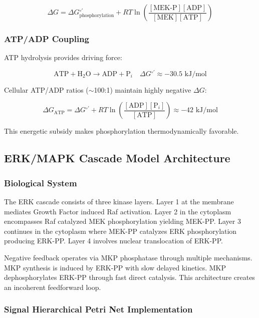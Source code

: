 \documentclass[twocolumn,11pt]{article}
\newcommand{\shpn}{Signal Hierarchical Petri Net}
\newcommand{\erk}{ERK}
\newcommand{\mkp}{MKP}
\newcommand{\mapk}{MAPK}
\newcommand{\dg}{\Delta G}
\begin{document}
\begin{equation}
\dg{} = \dg{}^{\circ\prime}_{\text{phosphorylation}} + RT \ln\left(\frac{[\text{MEK-P}][\text{ADP}]}{[\text{MEK}][\text{ATP}]}\right)
\end{equation}

\subsubsection{ATP/ADP Coupling}

ATP hydrolysis provides driving force:

\begin{equation}
\text{ATP} + \text{H}_2\text{O} \to \text{ADP} + \text{P}_i \quad \dg{}^{\circ\prime} \approx -30.5 \text{ kJ/mol}
\end{equation}

Cellular ATP/ADP ratios ($\sim$100:1) maintain highly negative $\dg{}$:

\begin{equation}
\dg{}_{\text{ATP}} = \dg{}^{\circ\prime} + RT \ln\left(\frac{[\text{ADP}][\text{P}_i]}{[\text{ATP}]}\right) \approx -42 \text{ kJ/mol}
\end{equation}

This energetic subsidy makes phosphorylation thermodynamically favorable.

\subsection{\erk{}/\mapk{} Cascade Model Architecture}

\subsubsection{Biological System}

The \erk{} cascade consists of three kinase layers. Layer 1 at the membrane mediates Growth Factor induced Raf activation. Layer 2 in the cytoplasm encompasses Raf catalyzed MEK phosphorylation yielding MEK-PP. Layer 3 continues in the cytoplasm where MEK-PP catalyzes \erk{} phosphorylation producing \erk{}-PP. Layer 4 involves nuclear translocation of \erk{}-PP.

Negative feedback operates via \mkp{} phosphatase through multiple mechanisms. \mkp{} synthesis is induced by \erk{}-PP with slow delayed kinetics. \mkp{} dephosphorylates \erk{}-PP through fast direct catalysis. This architecture creates an incoherent feedforward loop.

\subsubsection{\shpn{} Implementation}
\end{document}
